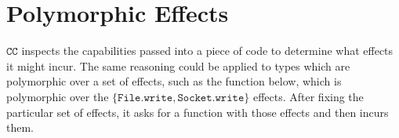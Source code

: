 \documentclass[sigplan,10pt,review]{acmart}\settopmatter{printfolios=true,printccs=false,printacmref=false}
\newcommand{\kwa}[1]{\mathtt{#1}}
\newcommand{\epscalc}{\kwa{CC}}
\begin{document}
%
%
%

\section{Polymorphic Effects}

$\epscalc$ inspects the capabilities passed into a piece of code to determine what effects it might incur. The same reasoning could be applied to types which are polymorphic over a set of effects, such as the function below, which is polymorphic over the $\{ \kwa{File.write, Socket.write} \}$ effects. After fixing the particular set of effects, it asks for a function with those effects and then incurs them.
\end{document}
